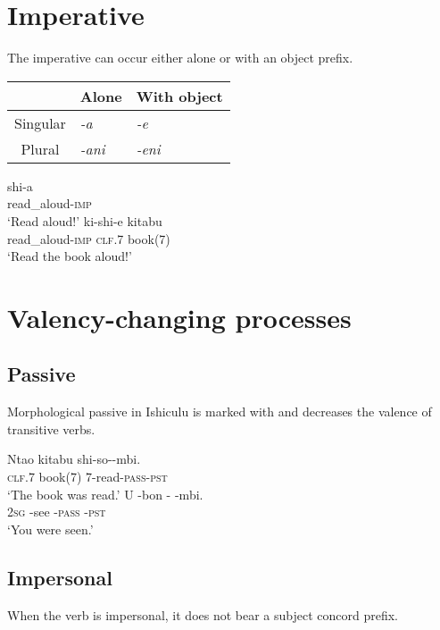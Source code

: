 \section{Imperative}

The imperative can occur either alone or with an object prefix.

\begin{tabular}{c|l|l}
\hline
& \multicolumn{1}{c|}{Alone} & \multicolumn{1}{c}{With object} \\
\hline
Singular & \textit{-a} & \textit{-e} \\
\hline
Plural & \textit{-ani} & \textit{-eni} \\
\hline
\end{tabular}

\begin{exe}
\ex
\gll shi-a \\
read\_aloud-\textsc{imp} \\
\trans `Read aloud!'
\ex
\gll ki-shi-e  kitabu \\
read\_aloud-\textsc{imp} \textsc{clf}.7 book(7) \\
\trans `Read the book aloud!'
\end{exe}

\section{Valency-changing processes}
\subsection{Passive}

Morphological passive in Ishiculu is marked with \textit{} and decreases the valence of transitive verbs.

\begin{exe}
\ex
\gll Nta\textbeltl o kitabu shi-so-\textit{}-mbi. \\
\textsc{clf}.7 book(7) \textsc{7}-read-\textsc{pass}-\textsc{pst}  \\
\trans `The book was read.'
\ex
\gll U -bon -\textit{} -mbi. \\
\textsc{2sg} -see -\textsc{pass} -\textsc{pst}  \\
\trans `You were seen.'
\end{exe}

\subsection{Impersonal}
When the verb is impersonal, it does not bear a subject concord prefix.

